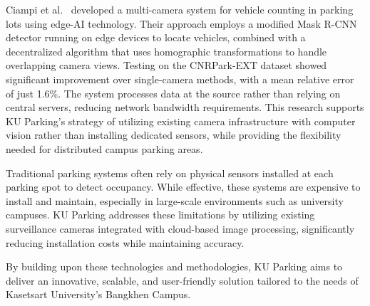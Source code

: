 Ciampi et al.~\cite{ciampi2022multicamera} developed a multi-camera system for vehicle counting in parking lots using edge-AI technology. 
Their approach employs a modified Mask R-CNN detector running on edge devices to locate vehicles, combined with a decentralized algorithm that uses homographic transformations to handle overlapping camera views. 
Testing on the CNRPark-EXT dataset showed significant improvement over single-camera methods, with a mean relative error of just 1.6\%. 
The system processes data at the source rather than relying on central servers, reducing network bandwidth requirements. 
This research supports KU Parking's strategy of utilizing existing camera infrastructure with computer vision rather than installing dedicated sensors, 
while providing the flexibility needed for distributed campus parking areas.

Traditional parking systems often rely on physical sensors installed at each parking spot to detect occupancy. 
While effective, these systems are expensive to install and maintain, especially in large-scale environments such as university campuses. 
KU Parking addresses these limitations by utilizing existing surveillance cameras integrated with cloud-based image processing, 
significantly reducing installation costs while maintaining accuracy.

By building upon these technologies and methodologies, KU Parking aims to deliver an innovative, scalable, and user-friendly solution tailored to the needs of Kasetsart University's Bangkhen Campus.